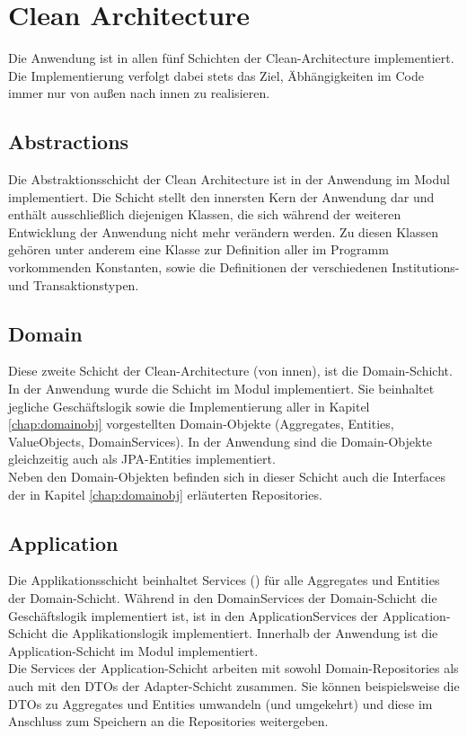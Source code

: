 \section{Clean Architecture}
Die Anwendung ist in allen fünf Schichten der Clean-Architecture implementiert. Die Implementierung verfolgt dabei stets das Ziel, Äbhängigkeiten im Code immer nur von außen nach innen zu realisieren.

\subsection{Abstractions}
Die Abstraktionsschicht der Clean Architecture ist in der Anwendung im Modul  implementiert. Die Schicht stellt den innersten Kern der Anwendung dar und enthält ausschließlich diejenigen Klassen, die sich während der weiteren Entwicklung der Anwendung nicht mehr verändern werden. Zu diesen Klassen gehören unter anderem eine Klasse zur Definition aller im Programm vorkommenden Konstanten, sowie die Definitionen der verschiedenen Institutions- und Transaktionstypen.

\subsection{Domain}
Diese zweite Schicht der Clean-Architecture (von innen), ist die Domain-Schicht. In der Anwendung wurde die Schicht im Modul  implementiert. Sie beinhaltet jegliche Geschäftslogik sowie die Implementierung aller in Kapitel \ref{chap:domainobj} vorgestellten Domain-Objekte (Aggregates, Entities, ValueObjects, DomainServices). In der Anwendung sind die Domain-Objekte gleichzeitig auch als JPA-Entities implementiert.\\
Neben den Domain-Objekten befinden sich in dieser Schicht auch die Interfaces der in Kapitel \ref{chap:domainobj} erläuterten Repositories.

\subsection{Application}
Die Applikationsschicht beinhaltet Services () für alle Aggregates und Entities der Domain-Schicht. Während in den DomainServices der Domain-Schicht die Geschäftslogik implementiert ist, ist in den ApplicationServices der Application-Schicht die Applikationslogik implementiert. Innerhalb der Anwendung ist die Application-Schicht im Modul  implementiert.\\
Die Services der Application-Schicht arbeiten mit sowohl Domain-Repositories als auch mit den DTOs der Adapter-Schicht zusammen. Sie können beispielsweise die DTOs zu Aggregates und Entities umwandeln (und umgekehrt) und diese im Anschluss zum Speichern an die Repositories weitergeben.

